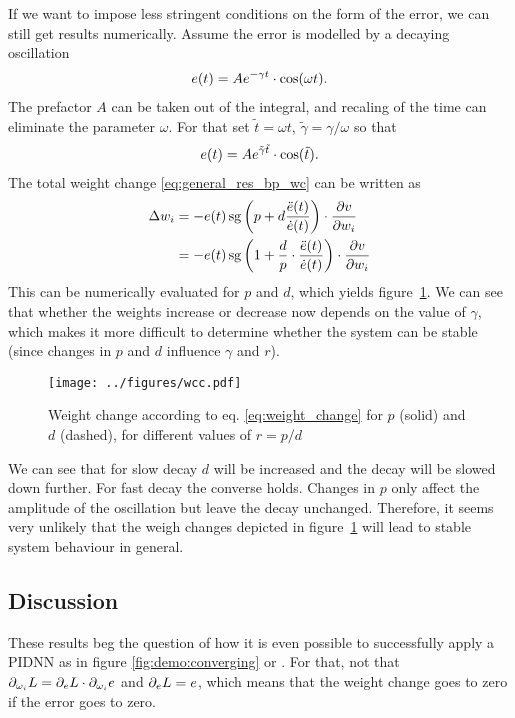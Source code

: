 \documentclass{article}
\begin{document}
    If we want to impose less stringent conditions on the form of the error, we can still get results numerically. Assume
    the error is modelled by a decaying oscillation
    \begin{align}
        e(t) = A e^{-\gamma t} \cdot \cos(\omega t).
    \end{align}
    The prefactor $A$ can be taken out of the integral, and recaling of the time can eliminate the parameter $\omega$.
    For that set $\tilde{t} = \omega t$, $\tilde{\gamma} = \gamma / \omega$ so that
    \begin{align}
        e(t) = A e^{\tilde{\gamma} \tilde{t}} \cdot \cos(\tilde{t}).
    \end{align}
    The total weight change \eqref{eq:general_res_bp_wc} can be written as
    \begin{align}
        \Delta w_i &= -e(t) \operatorname{sg} \left( p + d \frac{\ddot{e}(t)}{\dot{e}(t)}\right)  \cdot \frac{\partial v}{\partial w_i} \nonumber \\
                   &= -e(t) \operatorname{sg} \left( 1 + \frac{d}{p}\cdot \frac{\ddot{e}(t)}{\dot{e}(t)}\right)  \cdot \frac{\partial v}{\partial w_i}
                   \label{eq:weight_change}
    \end{align}
    This can be numerically evaluated for $p$ and $d$, which yields figure~\ref{fig:weight_change}. We can see that 
    whether the weights increase or decrease now depends on the value of $\gamma$, which makes it more difficult to 
    determine whether the system can be stable (since changes in $p$ and $d$ influence $\gamma$ and $r$).
    \begin{figure}[tb]
        \centering
        \texttt{[image: ../figures/wcc.pdf]}
        \caption{Weight change according to eq. \eqref{eq:weight_change} for $p$ (solid) and $d$ (dashed), for different 
        values of $r = p/d$}
        \label{fig:weight_change}
    \end{figure}
    We can see that for slow decay $d$ will be increased and the decay will be slowed down further. For fast decay the 
    converse holds. Changes in $p$ only affect the amplitude of the oscillation but leave the decay unchanged.
    Therefore, it seems very unlikely that the weigh changes depicted in figure~\ref{fig:weight_change} will lead to 
    stable system behaviour in general.
    

  \subsection{Discussion}
    These results beg the question of how it is even possible to successfully apply a PIDNN as in figure \ref{fig:demo:converging}
    or \cite{cong_novel_2005,yu_applying_2006}. For that, not that $\partial_{\omega_i}L = \partial_e L \cdot \partial_{\omega_i} e$ and
    $\partial_e L = e$, which means that the weight change goes to zero if the error goes to zero.
\end{document}
